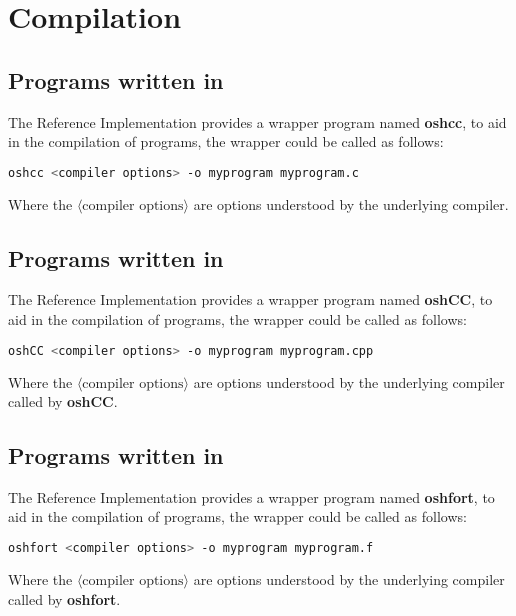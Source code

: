 \section{Compilation}
\subsection*{Programs written in \Cstd}

The \openshmem{} Reference Implementation provides a wrapper program named
\textbf{oshcc}, to aid in the compilation of \Cstd programs, the wrapper
could be called as follows:

\begin{lstlisting}[language=bash]
oshcc <compiler options> -o myprogram myprogram.c
\end{lstlisting}
Where the $\langle\mbox{compiler options}\rangle$ are options understood by the
underlying \Cstd compiler.


\subsection*{Programs written in \Cpp}

The  \openshmem{} Reference Implementation provides a wrapper program named
\textbf{oshCC}, to aid in the compilation of \Cpp{} programs, the wrapper could
be called as follows:

\begin{lstlisting}[language=bash]
oshCC <compiler options> -o myprogram myprogram.cpp
\end{lstlisting}
Where the $\langle\mbox{compiler options}\rangle$ are options understood by the
underlying \Cpp{} compiler called by \textbf{oshCC}.


\subsection*{Programs written in \Fortran}

The  \openshmem{} Reference Implementation provides a wrapper program named
\textbf{oshfort}, to aid in the compilation of \Fortran{} programs, the wrapper
could be called as follows:

\begin{lstlisting}[language=bash]
oshfort <compiler options> -o myprogram myprogram.f
\end{lstlisting}
Where the $\langle\mbox{compiler options}\rangle$ are options understood by the
underlying \Fortran{} compiler called by \textbf{oshfort}.

